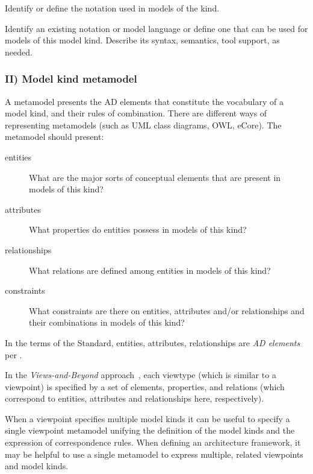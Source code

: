 Identify or define the notation used in models of the kind.

Identify an existing notation or model language or define one that can
be used for models of this model kind. Describe its syntax, semantics,
tool support, as needed.


\subsubsection{II) Model kind metamodel \Optional} 

A metamodel presents the AD elements that constitute the
vocabulary of a model kind, and their rules of combination. There are
different ways of representing metamodels (such as UML class diagrams, OWL,
eCore). The metamodel should present:
\begin{description}
\item[entities] What are the major sorts of conceptual elements that
  are present in models of this kind?
\item[attributes] What properties do entities possess in models of
  this kind?
\item[relationships] What relations are defined among entities in
  models of this kind?
\item[constraints] What constraints are there on entities, attributes
  and/or relationships and their combinations in models of this kind?
\end{description}


In the terms of the Standard, entities, attributes, relationships are
\textit{AD elements} per .

In the \textit{Views-and-Beyond} approach~\cite{DSA:2010}, each
viewtype (which is similar to a viewpoint) is specified by a set of
elements, properties, and relations (which correspond to entities,
attributes and relationships here, respectively).

When a viewpoint specifies multiple model kinds it can be useful to
specify a single viewpoint metamodel unifying the definition of the
model kinds and the expression of correspondence rules.  When defining
an architecture framework, it may be helpful to use a single metamodel
to express multiple, related viewpoints and model kinds.



